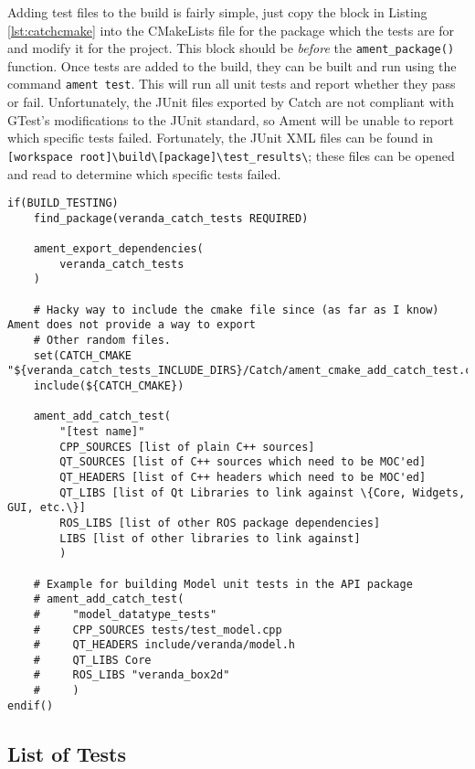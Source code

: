 Adding test files to the build is fairly simple, just copy the block in Listing \ref{lst:catchcmake} into the CMakeLists file for the package which the tests are for and modify it for the project. This block should be \textit{before} the \lstinline|ament_package()| function. Once tests are added to the build, they can be built and run using the command \lstinline|ament test|. This will run all unit tests and report whether they pass or fail. Unfortunately, the JUnit files exported by Catch are not compliant with GTest's modifications to the JUnit standard, so Ament will be unable to report which specific tests failed. Fortunately, the JUnit XML files can be found in \lstinline|[workspace root]\build\[package]\test_results\|; these files can be opened and read to determine which specific tests failed.

\begin{lstlisting}[caption={Example CMake code for adding a Catch test}, label={lst:catchcmake}]
if(BUILD_TESTING)
    find_package(veranda_catch_tests REQUIRED)

    ament_export_dependencies(
        veranda_catch_tests
    )

    # Hacky way to include the cmake file since (as far as I know) Ament does not provide a way to export
    # Other random files.
    set(CATCH_CMAKE "${veranda_catch_tests_INCLUDE_DIRS}/Catch/ament_cmake_add_catch_test.cmake")
    include(${CATCH_CMAKE})

    ament_add_catch_test(
        "[test name]"
        CPP_SOURCES [list of plain C++ sources]
        QT_SOURCES [list of C++ sources which need to be MOC'ed]
        QT_HEADERS [list of C++ headers which need to be MOC'ed]
        QT_LIBS [list of Qt Libraries to link against \{Core, Widgets, GUI, etc.\}]
        ROS_LIBS [list of other ROS package dependencies]
        LIBS [list of other libraries to link against]
        )

    # Example for building Model unit tests in the API package 
    # ament_add_catch_test(
    #     "model_datatype_tests"
    #     CPP_SOURCES tests/test_model.cpp
    #     QT_HEADERS include/veranda/model.h
    #     QT_LIBS Core
    #     ROS_LIBS "veranda_box2d"
    #     )
endif()
\end{lstlisting}

\subsection{List of Tests}
